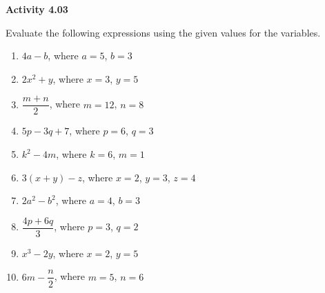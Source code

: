 \vspace{0.3ex}
\noindent\textbf{Activity 4.03}

\vspace{0.2ex}

Evaluate the following expressions using the given values for the variables. 

\begin{enumerate}
    \item \(4a - b\), where \(a = 5\), \(b = 3\)  
    \item \(2x^2 + y\), where \(x = 3\), \(y = 5\)  
    \item \(\dfrac{m + n}{2}\), where \(m = 12\), \(n = 8\)  
    \item \(5p - 3q + 7\), where \(p = 6\), \(q = 3\)  
    \item \(k^2 - 4m\), where \(k = 6\), \(m = 1\)  
    \item \(3(x + y) - z\), where \(x = 2\), \(y = 3\), \(z = 4\)  
    \item \(2a^2 - b^2\), where \(a = 4\), \(b = 3\)  
    \item \(\dfrac{4p + 6q}{3}\), where \(p = 3\), \(q = 2\)  
    \item \(x^3 - 2y\), where \(x = 2\), \(y = 5\)  
    \item \(6m - \dfrac{n}{2}\), where \(m = 5\), \(n = 6\)  
\end{enumerate}
